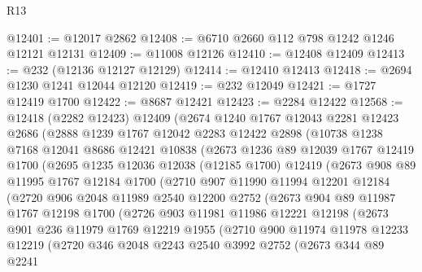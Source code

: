 \begin{lexlean}{R13}
\begin{coremodule}
@12401 := @12017 @2862
@12408 := @6710 @2660 @112 @798 @1242 @1246 @12121 @12131
@12409 := @11008 @12126
@12410 := @12408 @12409
@12413 := @232 (@12136 @12127 @12129)
@12414 := @12410 @12413
@12418 := @2694 @1230 @1241 @12044 @12120
@12419 := @232 @12049
@12421 := @1727 @12419 @1700
@12422 := @8687 @12421
@12423 := @2284 @12422
@12568 := @12418
    (@2282 @12423)
    @12409
    (@2674
      @1240
      @1767
      @12043
      @2281
      @12423
      @2686
      (@2888
        @1239
        @1767
        @12042
        @2283
        @12422
        @2898
        (@10738
          @1238
          @7168
          @12041
          @8686
          @12421
          @10838
          (@2673
            @1236
            @89
            @12039
            @1767
            @12419
            @1700
            (@2695
              @1235
              @12036
              @12038
              (@12185 @1700)
              @12419
              (@2673
                @908
                @89
                @11995
                @1767
                @12184
                @1700
                (@2710
                  @907
                  @11990
                  @11994
                  @12201
                  @12184
                  (@2720
                    @906
                    @2048
                    @11989
                    @2540
                    @12200
                    @2752
                    (@2673
                      @904
                      @89
                      @11987
                      @1767
                      @12198
                      @1700
                      (@2726
                        @903
                        @11981
                        @11986
                        @12221
                        @12198
                        (@2673
                          @901
                          @236
                          @11979
                          @1769
                          @12219
                          @1955
                          (@2710
                            @900
                            @11974
                            @11978
                            @12233
                            @12219
                            (@2720
                              @346
                              @2048
                              @2243
                              @2540
                              @3992
                              @2752
                              (@2673
                                @344
                                @89
                                @2241

\end{coremodule}
\end{lexlean}
